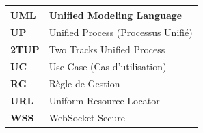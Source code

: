 \begin{table}[H]
\begin{tabular}{|p{3.2cm}|p{10cm}|}
		\hline
		\textbf{UML}    & Unified Modeling Language \\[3pt]
		\hline
		\textbf{UP}     & Unified Process (Processus Unifié) \\[3pt]
		\hline
		\textbf{2TUP}   & Two Tracks Unified Process \\[3pt]
		\hline
		\textbf{UC}     & Use Case (Cas d'utilisation) \\[3pt]
		\hline
		\textbf{RG}     & Règle de Gestion \\[3pt]
		\hline
		\textbf{URL}    & Uniform Resource Locator \\[3pt]
		\hline
		\textbf{WSS}    & WebSocket Secure \\[3pt]
		\hline
	\end{tabular}
\end{table}